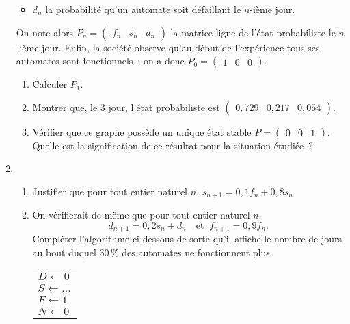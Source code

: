 \begin{enumerate}
\begin{itemize}
          \item $d_n$ la probabilité qu'un automate soit défaillant le $n$-ième jour.
     \end{itemize}
     On note alors $P_n = \begin{pmatrix}f_n &s_n&d_n \end{pmatrix}$ la matrice ligne de l'état probabiliste le $n$-ième jour.
     Enfin, la société observe qu'au début de l'expérience tous ses automates sont fonctionnels~: on a donc $P_0 = \begin{pmatrix}1 &0 &0\end{pmatrix}$.
     \begin{enumerate}[label=\alph*.]
          \item Calculer $P_1$.
          \item Montrer que, le 3 jour, l'état probabiliste est $\begin{pmatrix}0,729 &0,217 &0,054\end{pmatrix}$.
          \item  Vérifier que ce graphe possède un unique état stable $P = \begin{pmatrix}0 &0 &1\end{pmatrix}$.
          Quelle est la signification de ce résultat pour la situation étudiée~?
     \end{enumerate}
     \item
     \begin{enumerate}[label=\alph*.]
          \item Justifier que pour tout entier naturel $n$, $s_{n+1} = 0,1f_n + 0,8s_n$.
          \item On vérifierait de même que pour tout entier naturel $n$,
          \[d_{n+1} = 0,2s_n + d_n \quad \text{et } \:f_{n+1} = 0,9f_n.\]
          Compléter l'algorithme ci-dessous de sorte qu'il affiche le nombre de jours au
          bout duquel 30\,\% des automates ne fonctionnent plus.
          \begin{center}
               \begin{extern}%
                    \begin{tabularx}{0.4\linewidth}{|X|}\hline
                         $D \gets 0$\\
                         $S \gets ...$\\
                         $F \gets 1$\\
                         $N \gets 0$\\

\end{tabularx}
\end{extern}
\end{center}
\end{enumerate}
\end{enumerate}
